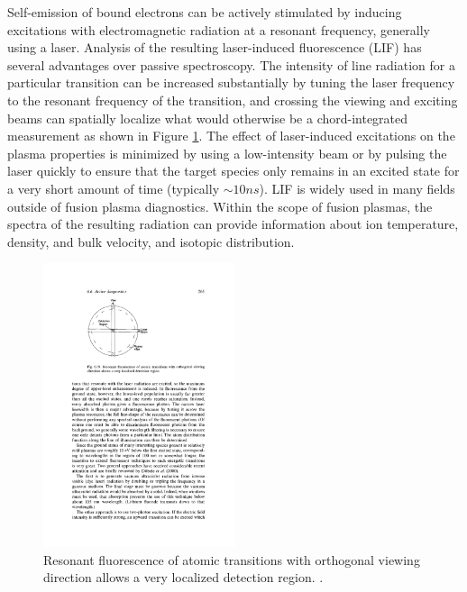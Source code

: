 \documentclass{jpp}
\begin{document}
Self-emission of bound electrons can be actively stimulated by inducing excitations with electromagnetic radiation at a resonant frequency, generally using a laser. Analysis of the resulting laser-induced fluorescence (LIF) has several advantages over passive spectroscopy. The intensity of line radiation for a particular transition can be increased substantially by tuning the laser frequency to the resonant frequency of the transition, and crossing the viewing and exciting beams can spatially localize what would otherwise be a chord-integrated measurement as shown in Figure \ref{fig:lif}. The effect of laser-induced excitations on the plasma properties is minimized by using a low-intensity beam or by pulsing the laser quickly to ensure that the target species only remains in an excited state for a very short amount of time (typically $\sim 10ns$). LIF is widely used in many fields outside of fusion plasma diagnostics. Within the scope of fusion plasmas, the spectra of the resulting radiation can provide information about ion temperature, density, and bulk velocity, and isotopic distribution.
\begin{figure}
  \centering
  \includegraphics[width=0.5\textwidth]{lif-localized-region.pdf}
  \caption{Resonant fluorescence of atomic transitions with orthogonal viewing direction allows a very localized detection region. \citep{Hutchinson_2002}.}
\label{fig:lif}
\end{figure}
\end{document}
